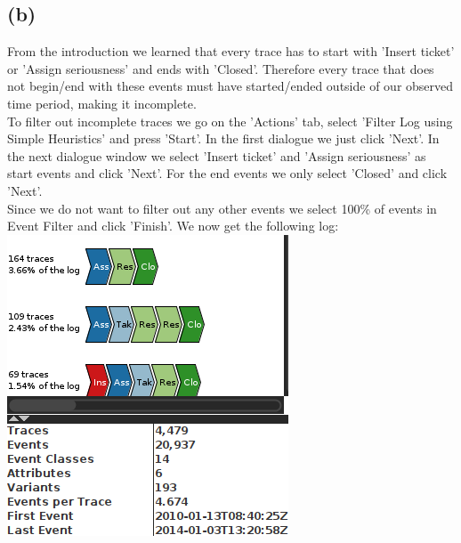 \documentclass[../../main.tex]{subfiles}
\begin{document}
\subsection*{(b)}
From the introduction we learned that every trace has to start with 'Insert ticket' or 'Assign seriousness' and ends with 'Closed'. Therefore every trace that does not begin/end with these events must have started/ended outside of our observed time period, making it incomplete.\\
To filter out incomplete traces we go on the 'Actions' tab, select 'Filter Log using Simple Heuristics' and press 'Start'. In the first dialogue we just click 'Next'. In the next dialogue window we select 'Insert ticket' and 'Assign seriousness' as start events and click 'Next'.
For the end events we only select 'Closed' and click 'Next'. \\
Since we do not want to filter out any other events we select 100\% of events in Event Filter and click 'Finish'. We now get the following log:\\
\includegraphics[width=0.4\columnwidth]{img/ProM_b_filter_log.png}\\
\end{document}
